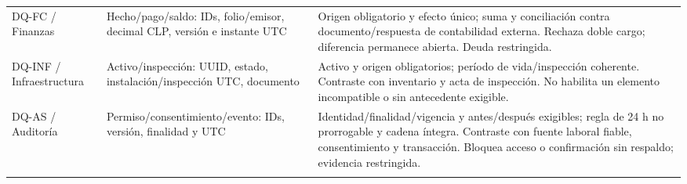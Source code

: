 \begin{longtable}{@{}L{.14\textwidth}L{.31\textwidth}L{\dimexpr.55\textwidth-12pt\relax}@{}}
DQ-FC / Finanzas & Hecho/pago/saldo: IDs, folio/emisor, decimal CLP, versión e instante UTC & Origen obligatorio y efecto único; suma y conciliación contra documento/respuesta de contabilidad externa. Rechaza doble cargo; diferencia permanece abierta. Deuda restringida. \\\addlinespace\hline
DQ-INF / Infraestructura & Activo/inspección: UUID, estado, instalación/inspección UTC, documento & Activo y origen obligatorios; período de vida/inspección coherente. Contraste con inventario y acta de inspección. No habilita un elemento incompatible o sin antecedente exigible. \\\addlinespace\hline
DQ-AS / Auditoría & Permiso/consentimiento/evento: IDs, versión, finalidad y UTC & Identidad/finalidad/vigencia y antes/después exigibles; regla de 24 h no prorrogable y cadena íntegra. Contraste con fuente laboral fiable, consentimiento y transacción. Bloquea acceso o confirmación sin respaldo; evidencia restringida. \\\addlinespace\hline
\end{longtable}
\endgroup

